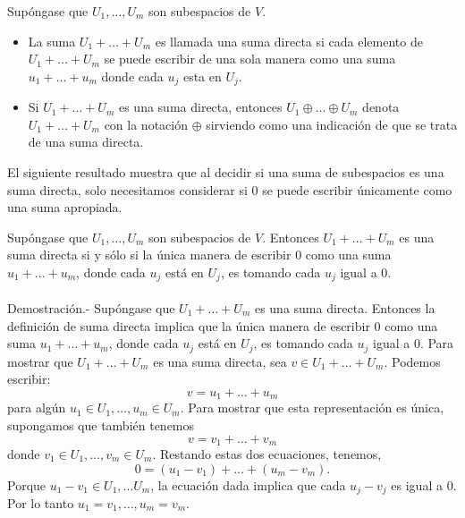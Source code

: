 \begin{tcolorbox}[colback=white]
    \begin{def.}
	Supóngase que $U_1,\ldots, U_m$ son subespacios de $V$.
	\begin{itemize}
	    \item La suma $U_1+\ldots + U_m$ es llamada una suma directa si cada elemento de $U_1+\ldots + U_m$ se puede escribir de una sola manera como una suma  $u_1 + \ldots + u_m$ donde cada $u_j$ esta en $U_j$.
	    \item Si $U_1 + \ldots + U_m$ es una suma directa, entonces $U_1 \oplus \ldots \oplus U_m$ denota $U_1 + \ldots + U_m$ con la notación $\oplus$ sirviendo como una indicación de que se trata de una suma directa.
	\end{itemize}
    \end{def.}
\end{tcolorbox}
\vspace{.5cm}

El siguiente resultado muestra que al decidir si una suma de subespacios es una suma directa, solo necesitamos considerar si 0 se puede escribir únicamente como una suma apropiada.\\

\begin{teo}
    Supóngase que $U_1,\ldots, U_m$ son subespacios de $V$. Entonces $U_1+\ldots + U_m$ es una suma directa si y sólo si la única manera de escribir $0$ como una suma $u_1 + \ldots + u_m$, donde cada $u_j$ está en $U_j$, es tomando cada $u_j$ igual a $0$.\\\\
	Demostración.-\; Supóngase que $U_1+\ldots + U_m$ es una suma directa. Entonces la definición de suma directa implica que la única manera de escribir $0$ como una suma $u_1 + \ldots + u_m$, donde cada $u_j$ está en $U_j$, es tomando cada $u_j$ igual a $0$. Para mostrar que $U_1 + \ldots + U_m$ es una suma directa, sea $v \in U_1 + \ldots + U_m$. Podemos escribir:
	$$v = u_1 + \ldots + u_m$$
	para algún $u_1 \in U_1 , \ldots, u_m \in U_m$. Para mostrar que esta representación es única, supongamos que también tenemos
	$$v = v_1 + \ldots + v_m$$
	donde $v_1 \in U_1,\ldots , v_m \in U_m$. Restando estas dos ecuaciones, tenemos,
	$$0=(u_1-v_1)+\ldots + (u_m - v_m).$$
	Porque $u_1-v_1\in U_1,\ldots U_m$, la ecuación dada implica que cada $u_j - v_j$ es igual a $0$. Por lo tanto $u_1 = v_1, \ldots , u_m = v_m$.\\

\end{teo}

